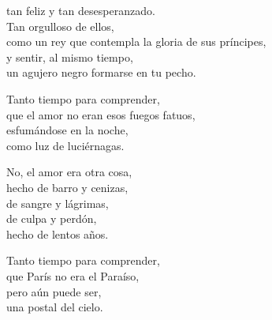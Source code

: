 \documentclass[12pt,twoside]{article}
\begin{document}
\begin{poem}
\begin{stanza}
tan feliz y tan desesperanzado.\\
Tan orgulloso de ellos,\\
como un rey que contempla la gloria de sus príncipes,\\
y sentir, al mismo tiempo,\\
un agujero negro formarse en tu pecho.
\end{stanza}
\begin{stanza}
Tanto tiempo para comprender,\\
que el amor no eran esos fuegos fatuos,\\
esfumándose en la noche,\\
como luz de luciérnagas.
\end{stanza}
\begin{stanza}
No, el amor era otra cosa,\\
hecho de barro y cenizas,\\
de sangre y lágrimas,\\
de culpa y perdón,\\
hecho de lentos años.
\end{stanza}
\begin{stanza}
Tanto tiempo para comprender,\\
que París no era el Paraíso,\\
pero aún puede ser,\\
una postal del cielo.
\end{stanza}
\end{poem}
\end{document}
